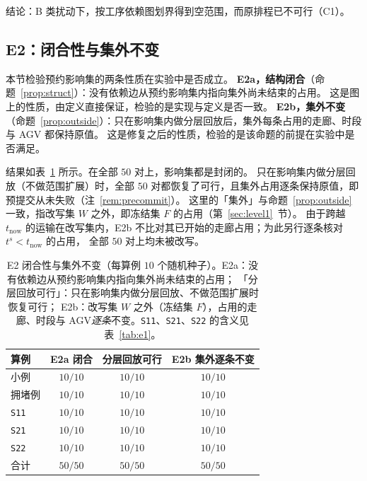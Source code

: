 \documentclass[manuscript,screen,review]{acmart}
\newcommand{\NSeeds}{10}
\newcommand{\NPairs}{50}
\newcommand{\FeasRtwo}{\NPairs/\NPairs}  %
\newcommand{\PassClosed}{\NPairs/\NPairs}    %
\newcommand{\PassInvar}{\NPairs/\NPairs}  %
\begin{document}
结论：B 类扰动下，按工序依赖图划界得到空范围，而原排程已不可行（C1）。

\subsection{E2：闭合性与集外不变}
\label{sec:e2}

本节检验预约影响集的两条性质在实验中是否成立。
\textbf{E2a，结构闭合}（命题~\ref{prop:struct}）：没有依赖边从预约影响集内指向集外尚未结束的占用。
这是图上的性质，由定义直接保证，检验的是实现与定义是否一致。
\textbf{E2b，集外不变}（命题~\ref{prop:outside}）：只在影响集内做分层回放后，集外每条占用的走廊、时段与 AGV 都保持原值。
这是修复之后的性质，检验的是该命题的前提在实验中是否满足。

结果如表~\ref{tab:e2} 所示。在全部 \(\NPairs\) 对上，影响集都是封闭的。
只在影响集内做分层回放（不做范围扩展）时，全部 \(\NPairs\) 对都恢复了可行，且集外占用逐条保持原值，即预提交从未失败（注~\ref{rem:precommit}）。
这里的「集外」与命题~\ref{prop:outside} 一致，指改写集 \(W\) 之外，即冻结集 \(F\) 的占用（第~\ref{sec:level1}~节）。
由于跨越 \(t_{\mathrm{now}}\) 的运输在改写集内，E2b 不比对其已开始的走廊占用；为此另行逐条核对 \(t^s<t_{\mathrm{now}}\) 的占用，
全部 \(\NPairs\) 对上均未被改写。

\begin{table}[t]
\centering
\caption{E2 闭合性与集外不变（每算例 \(\NSeeds\) 个随机种子）。E2a：没有依赖边从预约影响集内指向集外尚未结束的占用；
「分层回放可行」：只在影响集内做分层回放、不做范围扩展时恢复可行；
E2b：改写集 \(W\) 之外（冻结集 \(F\)），占用的走廊、时段与 AGV\emph{逐条}不变。\texttt{S11}、\texttt{S21}、\texttt{S22} 的含义见表~\ref{tab:e1}。}
\label{tab:e2}
\small
\begin{tabular}{@{}lccc@{}}
\toprule
算例 & E2a 闭合 & 分层回放可行 & E2b 集外逐条不变 \\
\midrule
小例   & \(10/10\) & \(10/10\) & \(10/10\) \\
拥堵例 & \(10/10\) & \(10/10\) & \(10/10\) \\
\texttt{S11}  & \(10/10\) & \(10/10\) & \(10/10\) \\
\texttt{S21}    & \(10/10\) & \(10/10\) & \(10/10\) \\
\texttt{S22}     & \(10/10\) & \(10/10\) & \(10/10\) \\
\midrule
合计 & \(\PassClosed\) & \(\FeasRtwo\) & \(\PassInvar\) \\
\bottomrule
\end{tabular}
\end{table}
\end{document}
